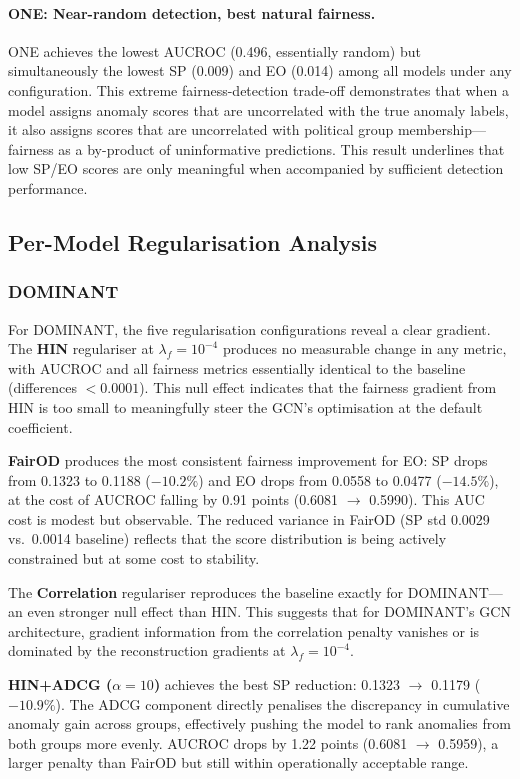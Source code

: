 \documentclass[sigconf,natbib=false]{acmart}
\begin{document}
\paragraph{ONE: Near-random detection, best natural fairness.}
ONE achieves the lowest AUCROC (0.496, essentially random) but simultaneously the lowest SP (0.009) and EO (0.014) among all models under any configuration. This extreme fairness-detection trade-off demonstrates that when a model assigns anomaly scores that are uncorrelated with the true anomaly labels, it also assigns scores that are uncorrelated with political group membership—fairness as a by-product of uninformative predictions. This result underlines that low SP/EO scores are only meaningful when accompanied by sufficient detection performance.

\subsection{Per-Model Regularisation Analysis}

\subsubsection{DOMINANT}

For DOMINANT, the five regularisation configurations reveal a clear gradient. The \textbf{HIN} regulariser at $\lambda_f = 10^{-4}$ produces no measurable change in any metric, with AUCROC and all fairness metrics essentially identical to the baseline (differences $< 0.0001$). This null effect indicates that the fairness gradient from HIN is too small to meaningfully steer the GCN's optimisation at the default coefficient.

\textbf{FairOD} produces the most consistent fairness improvement for EO: SP drops from 0.1323 to 0.1188 ($-10.2\%$) and EO drops from 0.0558 to 0.0477 ($-14.5\%$), at the cost of AUCROC falling by 0.91 points (0.6081 $\to$ 0.5990). This AUC cost is modest but observable. The reduced variance in FairOD (SP std 0.0029 vs.\ 0.0014 baseline) reflects that the score distribution is being actively constrained but at some cost to stability.

The \textbf{Correlation} regulariser reproduces the baseline exactly for DOMINANT—an even stronger null effect than HIN. This suggests that for DOMINANT's GCN architecture, gradient information from the correlation penalty vanishes or is dominated by the reconstruction gradients at $\lambda_f = 10^{-4}$.

\textbf{HIN+ADCG ($\alpha = 10$)} achieves the best SP reduction: 0.1323 $\to$ 0.1179 ($-10.9\%$). The ADCG component directly penalises the discrepancy in cumulative anomaly gain across groups, effectively pushing the model to rank anomalies from both groups more evenly. AUCROC drops by 1.22 points (0.6081 $\to$ 0.5959), a larger penalty than FairOD but still within operationally acceptable range.
\end{document}
